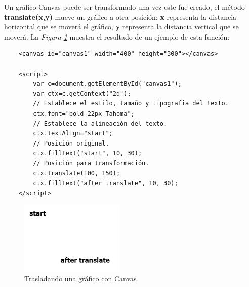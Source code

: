 Un gráfico Canvas puede ser transformado una vez este fue creado, el método \textbf{translate(x,y)} mueve un gráfico a otra posición: \textbf{x} representa la distancia horizontal que se moverá el gráfico, \textbf{y} representa la distancia vertical que se moverá. La \textit{Figura \ref{fig: 28}} muestra el resultado de un ejemplo de esta función:
\begin{lstlisting}
    <canvas id="canvas1" width="400" height="300"></canvas> 
            
    <script>
        var c=document.getElementById("canvas1");
        var ctx=c.getContext("2d");
        // Establece el estilo, tamaño y tipografia del texto.
        ctx.font="bold 22px Tahoma";
        // Establece la alineación del texto.
        ctx.textAlign="start";
        // Posición original.
        ctx.fillText("start", 10, 30);
        // Posición para transformación.
        ctx.translate(100, 150);
        ctx.fillText("after translate", 10, 30);
    </script>
\end{lstlisting}
\begin{figure}[H]
    \centering
    \caption{Trasladando una gráfico con Canvas}
    \label{fig: 28}
    \includegraphics[width=5cm]{ss_html/canvas_translate.png}
\end{figure}

